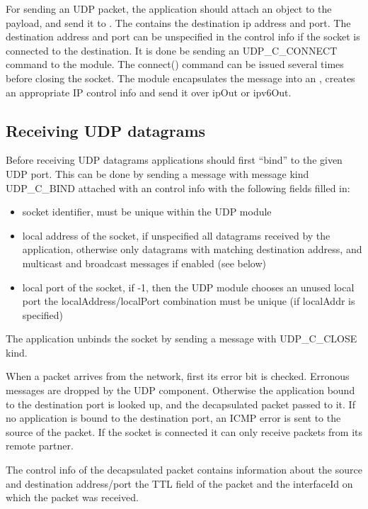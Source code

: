 For sending an UDP packet, the application should attach an 
object to the payload, and send it to . The 
contains the destination ip address and port. The destination address and port
can be unspecified in the control info if the socket is connected
to the destination. It is done be sending an UDP\_C\_CONNECT command to the 
module. The connect() command can be issued several
times before closing the socket.
The  module encapsulates the message into an ,
creates an appropriate IP control info and send it over ipOut or ipv6Out.

\subsection{Receiving UDP datagrams}

Before receiving UDP datagrams applications should first ``bind'' to the given UDP port.
This can be done by sending a message with message kind UDP\_C\_BIND attached with an
 control info with the following fields filled in:
\begin{itemize}
  \item {} socket identifier, must be unique within the UDP module
  \item {} local address of the socket, if unspecified all datagrams received
        by the application, otherwise only datagrams with matching destination address,
        and multicast and broadcast messages if enabled (see below)
  \item {} local port of the socket, if -1, then the UDP module chooses an unused local port
                         the localAddress/localPort combination must be unique (if localAddr is specified)
\end{itemize}

The application unbinds the socket by sending a message with UDP\_C\_CLOSE kind.

When a packet arrives from the network, first its error bit is checked. Erronous messages
are dropped by the UDP component. Otherwise the application bound to the destination port
is looked up, and the decapsulated packet passed to it. If no application is bound to
the destination port, an ICMP error is sent to the source of the packet. If the socket
is connected it can only receive packets from its remote partner.

The control info of the decapsulated packet contains information about
the source and destination address/port the TTL field of the packet
and the interfaceId on which the packet was received.

